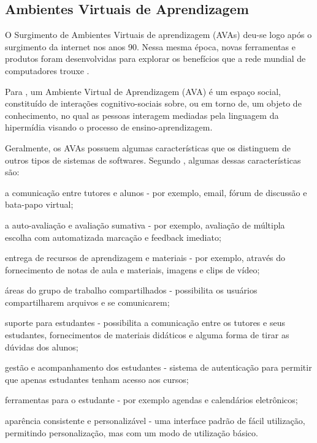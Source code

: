 \subsection{Ambientes Virtuais de Aprendizagem}

O Surgimento de Ambientes Virtuais de aprendizagem (AVAs) deu-se logo após o surgimento da internet nos anos 90. Nessa mesma época, novas ferramentas e produtos foram desenvolvidas para explorar os benefícios que a rede mundial de computadores trouxe \cite{oleary2002virtual}.

Para , um Ambiente Virtual de Aprendizagem (AVA) é um espaço social, constituído de interações cognitivo-sociais sobre, ou em torno de, um objeto de conhecimento, no qual as pessoas interagem mediadas pela linguagem da hipermídia visando o processo de ensino-aprendizagem.

Geralmente, os AVAs possuem algumas características que os distinguem de outros tipos de sistemas de softwares. Segundo , algumas dessas características são:
\begin{alineascomponto}
    \item a comunicação entre tutores e alunos - por exemplo, email, fórum de discussão e bata-papo virtual;
    \item a auto-avaliação e avaliação sumativa - por exemplo, avaliação de múltipla escolha com automatizada marcação e feedback imediato; 
    \item entrega de recursos de aprendizagem e materiais - por exemplo, através do fornecimento de notas de aula e materiais, imagens e clips de vídeo;
    \item áreas do grupo de trabalho compartilhados - possibilita os usuários compartilharem arquivos e se comunicarem;
    \item suporte para estudantes - possibilita a comunicação entre os tutores e seus estudantes, fornecimentos de materiais didáticos e alguma forma de tirar as dúvidas dos alunos;
    \item gestão e acompanhamento dos estudantes - sistema de autenticação para permitir que apenas estudantes tenham acesso aos cursos;
    \item ferramentas para o estudante - por exemplo agendas e calendários eletrônicos;
    \item aparência consistente e personalizável - uma interface padrão de fácil utilização, permitindo personalização, mas com um modo de utilização básico.
\end{alineascomponto}

